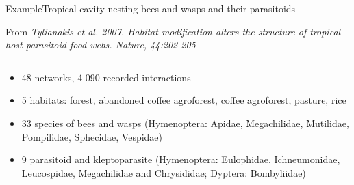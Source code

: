\documentclass{eecslides}
\begin{document}
	\begin{frame}{Example}{Tropical cavity-nesting bees and wasps and their parasitoids}
	    
	From \textit{Tylianakis et al. 2007. Habitat modification alters the structure of tropical host-parasitoid food webs. Nature, 44:202-205}
	\begin{columns}
		\begin{column}{0.7\textwidth}			
			\begin{itemize}
				\item 48 networks, 4 090 recorded interactions
				\item 5 habitats: forest, abandoned coffee agroforest, coffee agroforest, pasture, rice
				\item 33 species of bees and wasps (Hymenoptera: Apidae, Megachilidae, Mutilidae, Pompilidae, Sphecidae, Vespidae)
				\item 9 parasitoid and kleptoparasite (Hymenoptera: Eulophidae, Ichneumonidae, Leucospidae, Megachilidae and Chrysididae; Dyptera: Bombyliidae)
			\end{itemize}

		\end{column}


\end{columns}
\end{frame}
\end{document}
